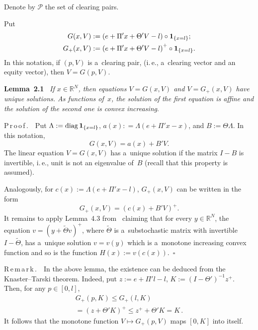 \begin{multicols}{2}
Denote by $\mathcal{P}$ the set of clearing pairs.

 Put 
\begin{align*}
G(x, V) &:=  \left(e + \Pi' x + \Theta' V - l\right) \circ {\bf 1}_{\{x = l\}};\\
G_+(x, V) &:=  \left(e + \Pi' x + \Theta' V - l\right)^+ \circ {\bf 1}_{\{x = l\}}. 
\end{align*}
In this notation, if $(p,V)$ is  a~clearing pair, (i.\,e., a~clearing vector and an equity vector), then   $V = G(p, V)$.

\smallskip

\noindent
\textbf{Lemma~2.1}\ %
\textit{If  $x \in \mathbb{R}^N$, then  equations $V = G(x, V)$ and $V = G_+(x, V)$ have unique solutions.  
As functions of~$x$, the solution of the first equation is  affine and the solution of the second  one is  convex increasing}. 


\noindent 
P\,r\,o\,o\,f\,.\ \
Put $\Lambda := \mathrm{diag}\,{\bf 1}_{\{x=l\}}$, $a(x): = \Lambda (e + \Pi'x - x)$, and $B := \Theta \Lambda$.
In this notation,
$$ 
G(x, V) = a(x) + B' V. 
$$
The  linear equation $V=G(x,V)$ has a~unique solution if the matrix 
$I-B$ is invertible, i.\,e., unit is not an eigenvalue of~$B$ (recall that this property is  assumed). 

 
 Analogously, for $c(x) := \Lambda (e + \Pi'x - l)$, $G_+(x, V)$ can be written in the form 
$$ G_+(x, V) = (c(x) + B' V)^+.
 $$
It remains to apply   Lemma~4.3 from~\cite{kabanov2018clearing} claiming that for every $y\in \mathbb{R}^N$, 
the equation $v=(y+\tilde \Theta v)^+$, where $\tilde \Theta$ is a~substochastic matrix with invertible $I-\tilde \Theta$, 
has a~unique solution $v=v(y)$ which is a~monotone increasing  convex function and so is the function $H(x):=v(c(x))$.~\hfill$\square$ 

\smallskip

\noindent 
R\,e\,m\,a\,r\,k\,.\ \
In the above lemma, the existence can be deduced from the Knaster--Tarski theorem. Indeed, put 
$z := e + \Pi' l - l$, $K := (I - \Theta')^{-1} z^+$. Then, for any $p \in [0, l]$,
\begin{multline*}
G_+(p, K) \leq G_+(l, K) \\
{}= \left(z + \Theta' K\right)^+ \leq z^+ + \Theta' K =  K\,.  
\end{multline*}
It follows that  the monotone function  $V \mapsto G_+(p, V)$ maps $[0, K]$ into itself.



\smallskip


\end{multicols}
